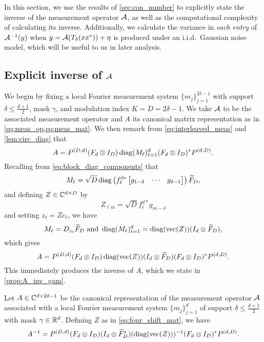 In this section, we use the results of \cref{sec:con_number} to explicitly state the inverse of the measurement operator $\mathcal{A}$, as well as the computational complexity of calculating its inverse.  Additionally, we calculate the variance in \emph{each entry} of $\mathcal{A}^{-1}(y)$ when $y = \mathcal{A}(T_\delta(x x^*)) + \eta$ is produced under an i.i.d.~Gaussian noise model, which will be useful to us in later analysis.

\subsection{Explicit inverse of $\mathcal{A}$}

We begin by fixing a local Fourier measurement system $\{m_j\}_{j = 1}^{2 \delta - 1}$ with support $\delta \le \frac{d + 1}{2}$, mask $\gamma$, and modulation index $K = D = 2 \delta - 1$.  We take $\mathcal{A}$ to be the associated measurement operator and $A$ its canonical matrix representation as in \cref{eq:meas_op,eq:meas_mat}.  We then remark from \eqref{eq:interleaved_meas} and \cref{lem:circ_diag} that \[A = P^{(D, d)} (F_d \otimes I_D) \operatorname{diag}(M_\ell)_{\ell = 1}^d (F_d \otimes I_D)^* P^{(d, D)}.\]  Recalling from \eqref{eq:block_diag_components} that \[M_\ell = \sqrt{D} \operatorname{diag}\left(f_\ell^{d*} \begin{bmatrix} g_{1 - \delta} & \cdots & g_{\delta - 1} \end{bmatrix} \right)\widetilde{F}_D,\] and defining $Z \in \mathbb{C}^{d \times D}$ by \begin{equation} Z_{\ell m} = \sqrt{D} f_\ell^{d*} g_{m - \delta} \label{eq:four_shift_mat}\end{equation} and setting $z_\ell = Z e_\ell$, we have \begin{equation} M_\ell = D_{z_\ell} \tF_D \ \text{and} \ \diag(M_\ell)_{\ell = 1}^d = \diag(\vec(Z)) (I_d \otimes \tF_D), \label{eq:M_rearr} \end{equation} which gives \[A = P^{(D, d)} (F_d \otimes I_D) \operatorname{diag}(\operatorname{vec}(Z)) (I_d \otimes \widetilde{F}_D) (F_d \otimes I_D)^* P^{(d, D)}.\]  This immediately produces the inverse of $A$, which we state in \cref{prop:A_inv_gam}.

\begin{proposition}
  Let $A \in \mathbb{C}^{d \times 2 \delta - 1}$ be the canonical representation of the measurement operator $\mathcal{A}$ associated with a local Fourier measurement system $\{m_j\}_{j = 1}^d$ of support $\delta \le \frac{d + 1}{2}$ with mask $\gamma \in \mathbb{R}^d$.  Defining $Z$ as in \eqref{eq:four_shift_mat}, we have
  \begin{equation} A^{-1} = P^{(D, d)} (F_d \otimes I_D) (I_d \otimes \widetilde{F}_D^*) (\operatorname{diag}(\operatorname{vec}(Z)))^{-1}  (F_d \otimes I_D)^* P^{(d, D)}. \label{eq:A_inv_gam} \end{equation}
  \label{prop:A_inv_gam}
\end{proposition}

